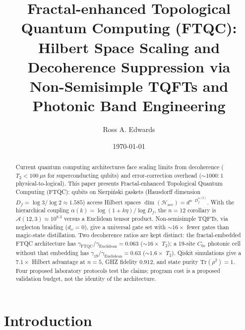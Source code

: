 \documentclass[aps,prx,twocolumn,superscriptaddress,floatfix]{revtex4-2}
\newcommand{\Hilbert}{\mathcal{H}}
\newcommand{\Df}{D_f}
\newcommand{\TraceOp}{\mathrm{Tr}}
\theoremstyle{plain}
\theoremstyle{definition}
\begin{document}
\title{Fractal-enhanced Topological Quantum Computing (FTQC): \\
Hilbert Space Scaling and Decoherence Suppression via \\
Non-Semisimple TQFTs and Photonic Band Engineering}

\author{Ross A. Edwards }

\date{\today}

\begin{abstract}
Current quantum computing architectures face scaling limits from decoherence ($T_2 < 100~\mu$s for superconducting qubits) and error-correction overhead ($\sim 1000:1$ physical-to-logical). This paper presents Fractal-enhanced Topological Quantum Computing (FTQC): qubits on Sierpi\'{n}ski gaskets (Hausdorff dimension $\Df = \log 3/\log 2 \approx 1.585$) access Hilbert spaces $\dim(\Hilbert_{\mathrm{acc}}) = d^{n \cdot \Df^{\alpha(k)}}$. With the hierarchical coupling $\alpha(k) = \log(1+k\eta)/\log \Df$, the $n=12$ corollary is $\mathcal{A}(12,3) \approx 10^{8.3}$ versus a Euclidean tensor product. Non-semisimple TQFTs, via neglecton braiding ($d_\omega = 0$), give a universal gate set with $\sim 16\times$ fewer gates than magic-state distillation. Two decoherence ratios are kept distinct: the fractal-embedded FTQC architecture has $\gamma_{\mathrm{FTQC}}/\gamma_{\mathrm{Euclidean}} = 0.063$ ($\sim 16\times$ $T_2$); a 19-site $C_{6v}$ photonic cell without that embedding has $\gamma_{19}/\gamma_{\mathrm{Euclidean}} = 0.63$ ($\sim 1.6\times$ $T_2$). Qiskit simulations give a $7.1\times$ Hilbert advantage at $n=5$, GHZ fidelity $0.912$, and state purity $\TraceOp(\rho^2)=1$. Four proposed laboratory protocols test the claims; program cost is a proposed validation budget, not the identity of the architecture.
\end{abstract}


\maketitle

\section{Introduction}
\label{sec:intro}
\end{document}
